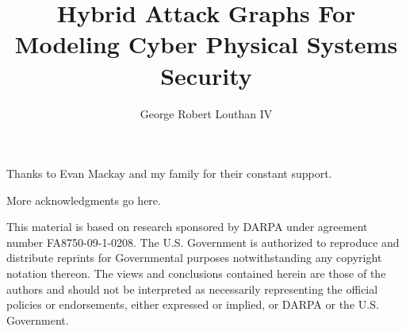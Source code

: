 \documentclass[12pt,letterpaper]{report}
\newif\iftestbox
\begin{document}
\iftestbox \testboxex \fi

%
%
\title{Hybrid Attack Graphs For Modeling Cyber Physical Systems Security}
\author{George Robert Louthan IV}

%
%
\coadvisorfalse  %

%
%


\numofpages{\pageref{LastPage}}                    %

%
%
\thesistrue  %

%
%

\copyrightfalse
\figurespagetrue   %
\tablespagetrue    %


\beforeabstract    %
\abstractp         %


%
%



\acknowledgementsp
%
%
Thanks to Evan Mackay and my family for their constant support.

More acknowledgments go here.

This material is based on research sponsored by DARPA under agreement number 
FA8750-09-1-0208. The U.S. Government is authorized to reproduce and distribute 
reprints for Governmental purposes notwithstanding any copyright notation 
thereon. The views and conclusions contained herein are those of the authors and
should not be interpreted as necessarily representing the official policies or 
endorsements, either expressed or implied, or DARPA or the U.S. Government.
\end{document}
